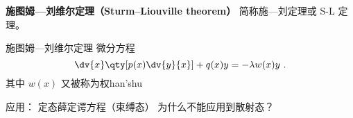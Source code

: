 
\begin{issues}
\issueDraft
\end{issues}


\textbf{施图姆—刘维尔定理（Sturm–Liouville theorem）} 简称施—刘定理或 S-L 定理。

\begin{theorem}{施图姆—刘维尔定理}
微分方程
\begin{equation}
\dv{x}\qty[p(x)\dv{y}{x}] + q(x) y = -\lambda w(x) y~.
\end{equation}
其中 $w(x)$ 又被称为权han'shu
\end{theorem}

应用： 定态薛定谔方程（束缚态） 为什么不能应用到散射态？
